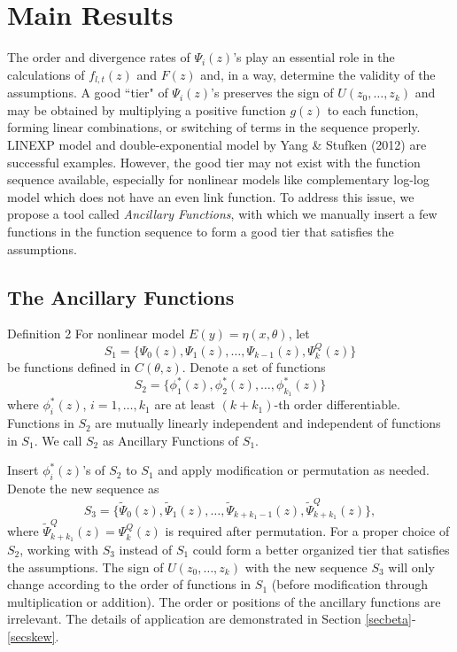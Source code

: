 \documentclass[12pt]{TD-CJS}
\begin{document}
 
\section{Main Results}\label{main}
The order and divergence rates of $\Psi_i(z)$'s play an essential role in the calculations of $f_{l,t}(z)$ and $F(z)$ and, in a way, determine the validity of the assumptions. A good ``tier" of $\Psi_i(z)$'s preserves the sign of $U(z_0,\ldots,z_k)$ and may be obtained by multiplying a positive function $g(z)$ to each function, forming linear combinations, or switching of terms in the sequence properly. LINEXP model and double-exponential model by Yang \& Stufken (2012) are successful examples. However, the good tier may not exist with the function sequence available, especially for nonlinear models like complementary log-log model which does not have an even link function. To address this issue, we propose a tool called \textit{Ancillary Functions}, with which we manually insert a few functions in the function sequence to form a good tier that satisfies the assumptions. 


\subsection{The Ancillary Functions} 
\begin{theorem}{Definition 2}{}\label{anci}
    For nonlinear model $E(y) = \eta(x,\theta)$, let \[S_1 = \{\Psi_0(z), \Psi_1(z), \ldots,\Psi_{k-1}(z) ,\Psi_k^Q(z)\}\] be functions defined in $C(\theta,z)$. Denote a set of functions \[ S_2 =\{\phi^*_1(z), \phi^*_2(z),\ldots, \phi^*_{k_1}(z)\}\] where $\phi^*_i(z)$, $i=1,\ldots,k_1$ are at least $(k+k_1)$-th order differentiable. Functions in $S_2$ are mutually linearly independent and independent of functions in $S_1$. We call $S_2$ as Ancillary Functions of $S_1$.
\end{theorem}

  Insert $\phi_i^*(z)$'s of $S_2$ to $S_1$ and apply modification or permutation as needed. Denote the new sequence as  \[S_3 = \{\tilde{\Psi}_0(z), \tilde{\Psi}_1(z), \ldots,\tilde{\Psi}_{k+k_1-1}(z), \tilde{\Psi}_{k+k_1}^Q(z)\},\]
  where $\tilde{\Psi}_{k+k_1}^Q(z) = \Psi_{k}^Q(z)$ is required after permutation. For a proper choice of $S_2$, working with $S_3$ instead of $S_1$ could form a better organized tier that satisfies the assumptions. The sign of $U(z_0,\ldots,z_k)$ with the new sequence $S_3$ will only change according to the order of functions in $S_1$ (before modification through multiplication or addition). The order or positions of the ancillary functions are irrelevant. The details of application are demonstrated in Section \ref{secbeta}-\ref{secskew}.
\end{document}
